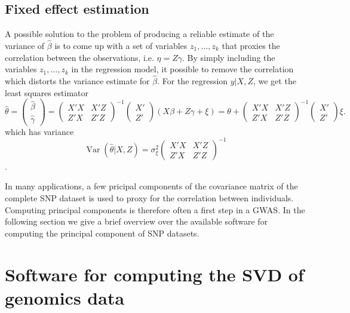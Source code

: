 \documentclass[final,leqno]{siamltex1213}
\DeclareMathOperator{\Var}{Var}
\begin{document}
\subsection{Fixed effect estimation}
A possible solution to the problem of producing a reliable estimate of the variance of $\hat{\beta}$ is to come up with a set of variables $z_1,\dots,z_k$ that proxies the correlation between the observations, i.e. $\eta=Z\gamma$. By simply including the variables $z_1,\dots,z_k$ in the regression model, it possible to remove the correlation which distorts the variance estimate for $\hat{\beta}$. For the regression $y|X,Z$, we get the least squares estimator
\begin{equation*}
    \hat{\theta} = \begin{pmatrix}\hat{\beta} \\ \hat{\gamma}\end{pmatrix} =
    \begin{pmatrix}
        X'X & X'Z \\ Z'X & Z'Z
    \end{pmatrix}^{-1}
    \begin{pmatrix}
        X' \\ Z'
    \end{pmatrix}
    (X\beta + Z\gamma + \xi)=
    \theta +
            \begin{pmatrix}
        X'X & X'Z \\ Z'X & Z'Z
    \end{pmatrix}^{-1}
    \begin{pmatrix}
        X' \\ Z'
    \end{pmatrix}\xi.
\end{equation*}
which has variance
\begin{equation*}
    \Var(\hat{\theta}|X,Z)=\sigma_\xi^2
        \begin{pmatrix} X'X & X'Z \\ Z'X & Z'Z \end{pmatrix}^{-1}
\end{equation*}.

In many applications, a few pricipal components of the covariance matrix of the complete SNP dataset is used to proxy for the correlation between individuals. Computing principal components is therefore often a first step in a GWAS. In the following section we give a brief overview over the available software for computing the principal component of SNP datasets.

\section{Software for computing the SVD of genomics data}
\end{document}
